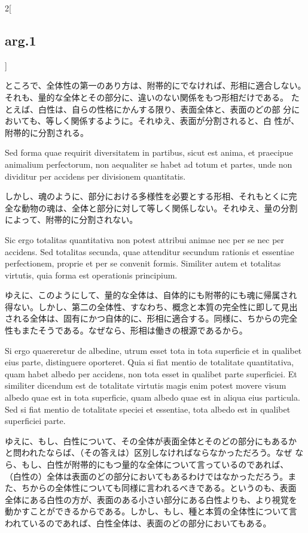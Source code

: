 \documentclass[paper=a4paper,fontsize=10pt,jafontsize=9pt,titlepage]{jlreq}
\begin{document}
\begin{paracol}{2}[\subsection{arg.1}]
\switchcolumn

ところで、全体性の第一のあり方は、附帯的にでなければ、形相に適合しない。
 それも、量的な全体とその部分に、違いのない関係をもつ形相だけである。
 たとえば、白性は、自らの性格にかんする限り、表面全体と、表面のどの部
 分においても、等しく関係するように。それゆえ、表面が分割されると、白
 性が、附帯的に分割される。
  
\switchcolumn*

 Sed forma quae requirit diversitatem in partibus, sicut est anima, et
 praecipue animalium perfectorum, non aequaliter se habet ad totum et
 partes, unde non dividitur per accidens per divisionem quantitatis.

\switchcolumn

しかし、魂のように、部分における多様性を必要とする形相、それもとくに完
全な動物の魂は、全体と部分に対して等しく関係しない。それゆえ、量の分割
によって、附帯的に分割されない。
 
 
\switchcolumn*

 Sic ergo totalitas
 quantitativa non potest attribui animae nec per se nec per
 accidens. Sed totalitas secunda, quae attenditur secundum rationis et
 essentiae perfectionem, proprie et per se convenit formis. Similiter
 autem et totalitas virtutis, quia forma est operationis principium.

\switchcolumn

ゆえに、このようにして、量的な全体は、自体的にも附帯的にも魂に帰属され
得ない。しかし、第二の全体性、すなわち、概念と本質の完全性に即して見出
される全体は、固有にかつ自体的に、形相に適合する。同様に、ちからの完全
性もまたそうである。なぜなら、形相は働きの根源であるから。
 
\switchcolumn*

 Si ergo quaereretur de albedine, utrum esset tota in tota superficie
 et in qualibet eius parte, distinguere oporteret. Quia si fiat mentio
 de totalitate quantitativa, quam habet albedo per accidens, non tota
 esset in qualibet parte superficiei. Et similiter dicendum est de
 totalitate virtutis magis enim potest movere visum albedo quae est in
 tota superficie, quam albedo quae est in aliqua eius particula. Sed
 si fiat mentio de totalitate speciei et essentiae, tota albedo est in
 qualibet superficiei parte.

\switchcolumn

ゆえに、もし、白性について、その全体が表面全体とそのどの部分にもあるか
と問われたならば、（その答えは）区別しなければならなかっただろう。なぜ
なら、もし、白性が附帯的にもつ量的な全体について言っているのであれば、
（白性の）全体は表面のどの部分においてもあるわけではなかっただろう。ま
た、ちからの全体性についても同様に言われるべきである。というのも、表面
全体にある白性の方が、表面のある小さい部分にある白性よりも、より視覚を
動かすことができるからである。しかし、もし、種と本質の全体性について言
われているのであれば、白性全体は、表面のどの部分においてもある。
 

\end{paracol}
\end{document}
